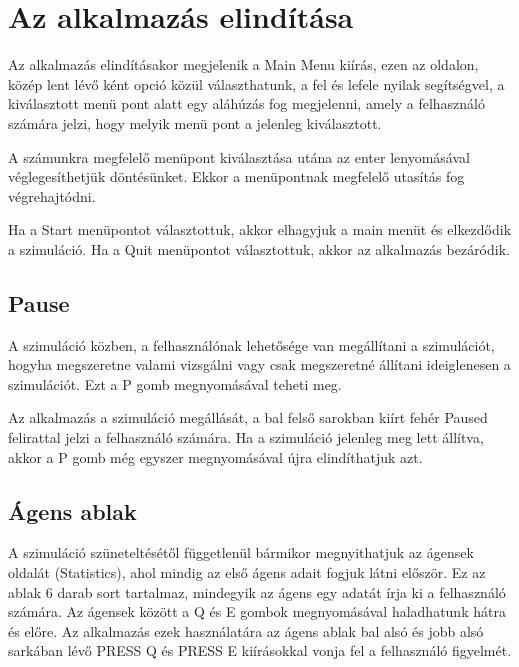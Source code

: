 
\section{Az alkalmazás elindítása}

Az alkalmazás elindításakor megjelenik a Main Menu kiírás, ezen az oldalon, közép lent lévő ként opció közül választhatunk,
a fel és lefele nyilak segítségvel, a kiválasztott menü pont alatt egy aláhúzás fog megjelenni,
amely a felhasználó számára jelzi, hogy melyik menü pont a jelenleg kiválasztott.

A számunkra megfelelő menüpont kiválasztása utána az enter lenyomásával véglegesíthetjük döntésünket.
Ekkor a menüpontnak megfelelő utasítás fog végrehajtódni.

Ha a Start menüpontot választottuk, akkor elhagyjuk a main menüt és elkezdődik a szimuláció.
Ha a Quit menüpontot választottuk, akkor az alkalmazás bezáródik.


\subsection{Pause}
A szimuláció közben, a felhasználónak lehetősége van megállítani a szimulációt, hogyha megszeretne valami vizsgálni vagy csak
megszeretné állítani ideiglenesen a szimulációt. Ezt a P gomb megnyomásával teheti meg.

Az alkalmazás a szimuláció megállását, a bal felső sarokban kiírt fehér Paused felirattal jelzi a felhasználó számára.
Ha a szimuláció jelenleg meg lett állítva, akkor a P gomb még egyszer megnyomásával újra elindíthatjuk azt.

\subsection{Ágens ablak}
A szimuláció szüneteltésétől függetlenül bármikor megnyithatjuk az ágensek oldalát (Statistics), ahol mindig az első ágens adait fogjuk látni először.
Ez az ablak 6 darab sort tartalmaz, mindegyik az ágens egy adatát írja ki a felhasználó számára.
Az ágensek között a Q és E gombok megnyomásával haladhatunk hátra és előre. Az alkalmazás ezek használatára az ágens ablak bal alsó és jobb alsó
sarkában lévő PRESS Q és PRESS E kiírásokkal vonja fel a felhasználó figyelmét.

